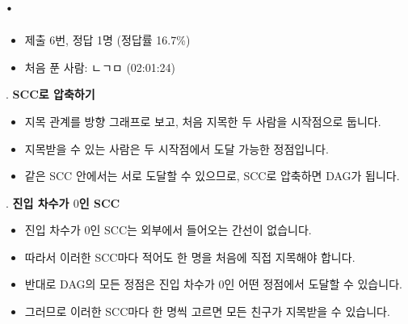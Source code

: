 
\section{\texorpdfstring{\pletter. \ptitle}{문제 \pletter}}

\begin{frame}[label=problem-H]
    \sectiontitle{\pletter}{\ptitle}
    \begin{itemize}
        \item 제출 6번, 정답 1명 (정답률 16.7\%)
        \item 처음 푼 사람: ㄴㄱㅁ (02:01:24)
    \end{itemize}
\end{frame}

\begin{frame}{\textbf{\pletter}. \ptitle}
    \textbf{SCC로 압축하기}
    \begin{itemize}
        \item 지목 관계를 방향 그래프로 보고, 처음 지목한 두 사람을 시작점으로 둡니다.
        \item 지목받을 수 있는 사람은 두 시작점에서 도달 가능한 정점입니다.
        \item 같은 SCC 안에서는 서로 도달할 수 있으므로, SCC로 압축하면 DAG가 됩니다.
    \end{itemize}
\end{frame}

\begin{frame}{\textbf{\pletter}. \ptitle}
    \textbf{진입 차수가 $0$인 SCC}
    \begin{itemize}
        \item 진입 차수가 $0$인 SCC는 외부에서 들어오는 간선이 없습니다.
        \item 따라서 이러한 SCC마다 적어도 한 명을 처음에 직접 지목해야 합니다.
        \item 반대로 DAG의 모든 정점은 진입 차수가 $0$인 어떤 정점에서 도달할 수 있습니다.
        \item 그러므로 이러한 SCC마다 한 명씩 고르면 모든 친구가 지목받을 수 있습니다.
    \end{itemize}
\end{frame}

